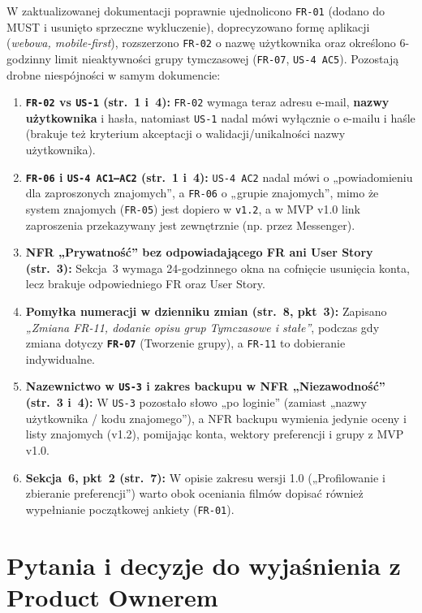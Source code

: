 \documentclass[10pt,a4paper]{article}
\begin{document}
W zaktualizowanej dokumentacji poprawnie ujednolicono \texttt{FR-01} (dodano do MUST i usunięto sprzeczne wykluczenie), doprecyzowano formę aplikacji (\textit{webowa, mobile-first}), rozszerzono \texttt{FR-02} o nazwę użytkownika oraz określono 6-godzinny limit nieaktywności grupy tymczasowej (\texttt{FR-07}, \texttt{US-4 AC5}). Pozostają drobne niespójności w samym dokumencie:
\begin{enumerate}
  \item \textbf{\texttt{FR-02} vs \texttt{US-1} (str.~1 i~4):} \texttt{FR-02} wymaga teraz adresu e-mail, \textbf{nazwy użytkownika} i hasła, natomiast \texttt{US-1} nadal mówi wyłącznie o e-mailu i haśle (brakuje też kryterium akceptacji o walidacji/unikalności nazwy użytkownika).
  \item \textbf{\texttt{FR-06} i \texttt{US-4 AC1–AC2} (str.~1 i~4):} \texttt{US-4 AC2} nadal mówi o „powiadomieniu dla zaproszonych znajomych”, a \texttt{FR-06} o „grupie znajomych”, mimo że system znajomych (\texttt{FR-05}) jest dopiero w \texttt{v1.2}, a w MVP v1.0 link zaproszenia przekazywany jest zewnętrznie (np. przez Messenger).
  \item \textbf{NFR „Prywatność” bez odpowiadającego FR ani User Story (str.~3):} Sekcja~3 wymaga 24-godzinnego okna na cofnięcie usunięcia konta, lecz brakuje odpowiedniego FR oraz User Story.
  \item \textbf{Pomyłka numeracji w dzienniku zmian (str.~8, pkt~3):} Zapisano \textit{„Zmiana FR-11, dodanie opisu grup Tymczasowe i stałe”}, podczas gdy zmiana dotyczy \textbf{\texttt{FR-07}} (Tworzenie grupy), a \texttt{FR-11} to dobieranie indywidualne.
  \item \textbf{Nazewnictwo w \texttt{US-3} i zakres backupu w NFR „Niezawodność” (str.~3 i~4):} W \texttt{US-3} pozostało słowo „po loginie” (zamiast „nazwy użytkownika / kodu znajomego”), a NFR backupu wymienia jedynie oceny i listy znajomych (v1.2), pomijając konta, wektory preferencji i grupy z MVP v1.0.
  \item \textbf{Sekcja~6, pkt~2 (str.~7):} W opisie zakresu wersji 1.0 („Profilowanie i zbieranie preferencji”) warto obok oceniania filmów dopisać również wypełnianie początkowej ankiety (\texttt{FR-01}).
\end{enumerate}

\newpage
\section{Pytania i decyzje do wyjaśnienia z Product Ownerem}
\end{document}
